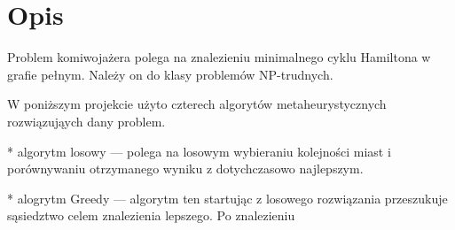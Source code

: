 \section{Opis}

Problem komiwojażera polega na znalezieniu minimalnego cyklu Hamiltona
w grafie pełnym. Należy on do klasy problemów NP-trudnych. 

W poniższym projekcie użyto czterech algorytów metaheurystycznych rozwiązująych 
dany problem. 

* algorytm losowy --- polega na losowym wybieraniu kolejności miast i 
porównywaniu otrzymanego wyniku z dotychczasowo najlepszym.

* alogrytm Greedy --- algorytm ten startując z losowego rozwiązania przeszukuje 
sąsiedztwo celem znalezienia lepszego. Po znalezieniu 